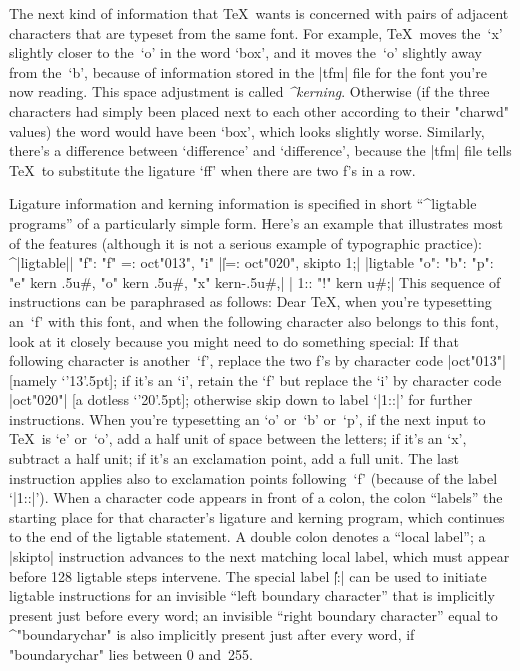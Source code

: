 \medbreak
The next kind of information that \TeX\ wants is concerned with
pairs of adjacent characters that are typeset from the same font.
For example, \TeX\ moves the~`x' slightly closer to the~`o' in the
word `box', and it moves the~`o' slightly away from the~`b', because
of information stored in the |tfm| file for the font you're now reading.
This space adjustment is called {\sl^{kerning}}. Otherwise (if the
three characters had simply been placed next to each other according
to their "charwd" values) the word would have been `b{}o{}x', which
looks slightly worse. Similarly, there's a difference between
`difference' and `dif{\null}ference', because the |tfm| file tells \TeX\
to substitute the ligature `ff' when there are two f's in a row.

Ligature information and kerning information is specified in short
``^{ligtable programs}'' of a particularly simple form. Here's an example
that illustrates most of the features (although it is not a serious
example of typographic practice):
\beginlines
^|ligtable|| "f": "f" =: oct"013", "i" |\||=: oct"020", skipto 1;|
|ligtable "o": "b": "p": "e" kern .5u#, "o" kern .5u#, "x" kern-.5u#,|
|          1:: "!" kern u#;|
\endlines
This sequence of instructions can be paraphrased as follows:
\smallskip
\hangindent 3pc
Dear \TeX, when you're typesetting an~`f' with this font, and when the
following character also belongs to this font, look at it closely because
you might need to do something special: If that following character is
another~`f', replace the two f's by character code |oct"013"|
[namely `\char'13'\kern.5pt];
if it's an `i', retain the `f' but replace the `i' by character code
|oct"020"| [a dotless `\char'20'\kern.5pt];
otherwise skip down to label `|1::|' for further instructions.
When you're typesetting an `o' or~`b' or~`p', if the next input to \TeX\ is
`e' or~`o', add a half unit
of space between the letters; if it's an `x', subtract a half unit; if it's an
exclamation point, add a full unit. The last instruction applies also
to exclamation points following~`f' (because of the label `|1::|').
\smallskip\noindent
When a character code appears in front of a colon, the colon ``labels''
the starting place for that character's ligature and kerning program,
which continues to the end of the ligtable statement. A double colon denotes
a ``local label''; a |skipto| instruction advances to the next matching local
label, which must appear before 128 ligtable steps intervene. The special
label \|\||:| can be used to initiate ligtable instructions for an invisible
``left boundary character'' that is implicitly present just before every
word; an invisible ``right boundary character'' equal to ^"boundarychar" is
also implicitly present just after every word, if "boundarychar" lies between
0 and~255.

